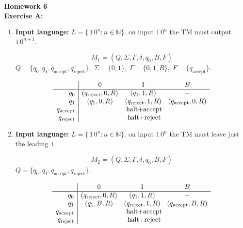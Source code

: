 \documentclass{article}
\theoremstyle{theorem}
\theoremstyle{definition}
\theoremstyle{remark}
\begin{document}
\textbf{Homework 6}\\
\textbf{Exercise A:}\\
\begin{enumerate}
  \item \textbf{Input language:} \(L = \{\,1\,0^n : n\in\mathbb{N}\}\). on input \(1\,0^n\) the TM must output \(1\,0^{n+1}\).

        \[
          M_1 = (Q,\Sigma,\Gamma,\delta,q_0,B,F)
        \]
        \(Q=\{q_0,q_1,q_{\mathrm{accept}},q_{\mathrm{reject}}\},\;
          \Sigma=\{0,1\},\;
          \Gamma=\{0,1,B\},\;
          F=\{q_{\mathrm{accept}}\}\).

        \[
        \begin{array}{r|ccc}
                 & 0                  & 1                         & B \\ \hline
        q_0      & (q_{\mathrm{reject}},0,R) & (q_1,1,R)                 &  - \\
        q_1      & (q_1,0,R)          & (q_{\mathrm{reject}},1,R) & (q_{\mathrm{accept}},0,R)\\
        q_{\mathrm{accept}} & \multicolumn{3}{c}{\text{halt+accept}}\\
        q_{\mathrm{reject}} & \multicolumn{3}{c}{\text{halt+reject}}\\
        \end{array}
        \]

  \item \textbf{Input language:} \(L = \{\,1\,0^n : n\in\mathbb{N}\}\). on input \(1\,0^n\) the TM must leave just the leading \(1\).

        \[
          M_2 = (Q,\Sigma,\Gamma,\delta,q_0,B,F)
        \]
        \(Q=\{q_0,q_1,q_{\mathrm{accept}},q_{\mathrm{reject}}\}\).

        \[
        \begin{array}{r|ccc}
                 & 0                  & 1                         & B \\ \hline
        q_0      & (q_{\mathrm{reject}},0,R) & (q_1,1,R)                 &  - \\
        q_1      & (q_1,B,R)          & (q_{\mathrm{reject}},1,R) & (q_{\mathrm{accept}},B,R)\\
        q_{\mathrm{accept}} & \multicolumn{3}{c}{\text{halt+accept}}\\
        q_{\mathrm{reject}} & \multicolumn{3}{c}{\text{halt+reject}}\\
        \end{array}
        \]


\end{enumerate}
\end{document}
